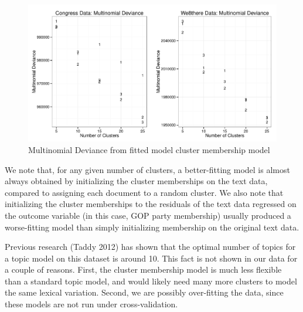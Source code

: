 \documentclass[12pt]{article}
\begin{document}
\begin{figure}[!htpb]
  \centering
  \includegraphics[width=6.2in]{Images/mdev_both.pdf}
  \caption[Multinomial Deviance: Congress Data]
   {Multinomial Deviance from fitted model cluster membership model}
\end{figure}


We note that, for any given number of clusters, a better-fitting model is almost always obtained by initializing the cluster memberships on the text data, compared to assigning each document to a random cluster.
We also note that initializing the cluster memberships to the residuals of the text data regressed on the outcome variable (in this case, GOP party membership) usually produced a worse-fitting model than simply initializing membership on the original text data.


Previous research (Taddy 2012) has shown that the optimal number of topics for a topic model on this dataset is around 10. This fact is not shown in our data for a couple of reasons.  First, the cluster membership model is much less flexible than a standard topic model, and would likely need many more clusters to model the same lexical variation. Second, we are possibly over-fitting the data, since these models are not run under cross-validation.

\end{document}
